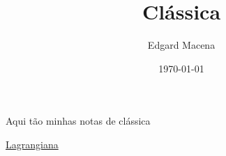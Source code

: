 \documentclass[11pt]{article}
\author{Edgard Macena}
\date{\today}
\title{Clássica}
\begin{document}
\maketitle
\tableofcontents

Aqui tão minhas notas de clássica

\href{20211123091021-lagrangiana.org}{Lagrangiana}
\end{document}
